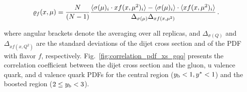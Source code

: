 \begin{equation}
  \varrho_f (x,\mu) =
  \frac{N}{(N-1)} \frac{%
    \langle \sigma(\mu)_i \cdot xf(x,\mu^2)_i \rangle -
    \langle \sigma(\mu)_i \rangle \cdot
    \langle xf(x,\mu^2)_i \rangle}
  {\Delta_{\sigma(\mu)} \Delta_{xf(x,\mu^2)}}\,.
\end{equation}

where angular brackets denote the averaging over all replicas, and
$\Delta_{\sigma(Q)}$ and $\Delta_{xf(x,Q^2)}$ are the standard deviations of the
dijet cross section and of the PDF with flavor $f$, respectively.
Fig.~\ref{fig:correlation_pdf_xs_gqq} presents the correlation coefficient
between the dijet cross section and the gluon, u valence quark, and d valence
quark PDFs for the central region ($y_{\mathrm{b}} < 1, y^* < 1$) and the
boosted region ($2 \leq y_{\mathrm{b}} < 3$).

